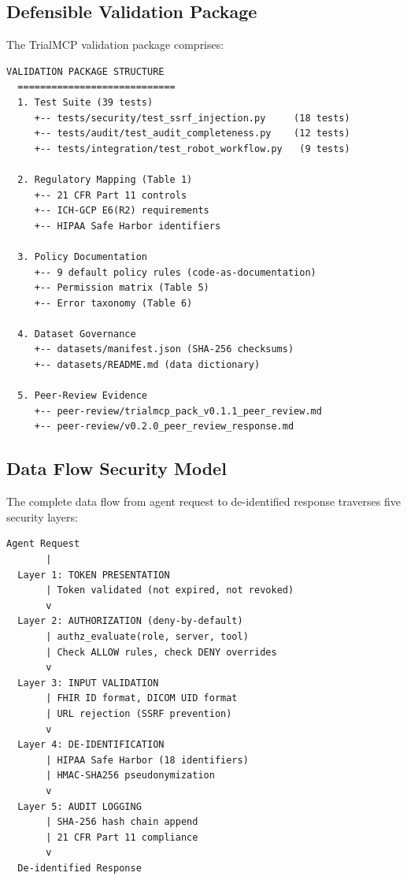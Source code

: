 \documentclass[10pt,letterpaper]{article}
\begin{document}
\subsection{Defensible Validation Package}

The TrialMCP validation package comprises:

\begin{lstlisting}[title={\textbf{Validation Package Contents}}]
  VALIDATION PACKAGE STRUCTURE
  ============================
  1. Test Suite (39 tests)
     +-- tests/security/test_ssrf_injection.py     (18 tests)
     +-- tests/audit/test_audit_completeness.py    (12 tests)
     +-- tests/integration/test_robot_workflow.py   (9 tests)

  2. Regulatory Mapping (Table 1)
     +-- 21 CFR Part 11 controls
     +-- ICH-GCP E6(R2) requirements
     +-- HIPAA Safe Harbor identifiers

  3. Policy Documentation
     +-- 9 default policy rules (code-as-documentation)
     +-- Permission matrix (Table 5)
     +-- Error taxonomy (Table 6)

  4. Dataset Governance
     +-- datasets/manifest.json (SHA-256 checksums)
     +-- datasets/README.md (data dictionary)

  5. Peer-Review Evidence
     +-- peer-review/trialmcp_pack_v0.1.1_peer_review.md
     +-- peer-review/v0.2.0_peer_review_response.md
\end{lstlisting}

\subsection{Data Flow Security Model}

The complete data flow from agent request to de-identified response traverses five security layers:

\begin{lstlisting}[title={\textbf{Privacy-Preserving Data Flow (5 Layers)}}]
  Agent Request
       |
  Layer 1: TOKEN PRESENTATION
       | Token validated (not expired, not revoked)
       v
  Layer 2: AUTHORIZATION (deny-by-default)
       | authz_evaluate(role, server, tool)
       | Check ALLOW rules, check DENY overrides
       v
  Layer 3: INPUT VALIDATION
       | FHIR ID format, DICOM UID format
       | URL rejection (SSRF prevention)
       v
  Layer 4: DE-IDENTIFICATION
       | HIPAA Safe Harbor (18 identifiers)
       | HMAC-SHA256 pseudonymization
       v
  Layer 5: AUDIT LOGGING
       | SHA-256 hash chain append
       | 21 CFR Part 11 compliance
       v
  De-identified Response
\end{lstlisting}
\end{document}
